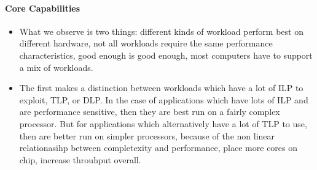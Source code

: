 \paragraph{Core Capabilities}
\begin{itemize}
\item 
What we observe is two things: 
different kinds of workload perform best on different hardware,
not all workloads require the same performance characteristics,
good enough is good enough, most computers have to support a 
mix of workloads. 
\item The first makes a distinction between workloads
which have a lot of ILP to exploit, TLP, or DLP.
In the case of applications which have lots of ILP and
are performance sensitive, then they are best run on a fairly complex
processor. But for applications which alternatively
have a lot of TLP to use, then are better run
on simpler processors, because of the non linear 
relationasihp between completexity and performance, place more cores on chip, 
increase throuhput overall. 


\end{itemize}
